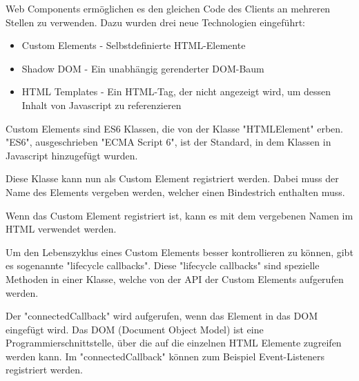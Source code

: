 
Web Components ermöglichen es den gleichen Code des Clients an mehreren Stellen zu verwenden. Dazu wurden drei neue Technologien \cite{MDNWebComponents} eingeführt:

\begin{itemize}
    \item Custom Elements - Selbstdefinierte HTML-Elemente
    \item Shadow DOM - Ein unabhängig gerenderter DOM-Baum
    \item HTML Templates - Ein HTML-Tag, der nicht angezeigt wird, um dessen Inhalt von Javascript zu referenzieren
\end{itemize}




Custom Elements sind ES6 Klassen, die von der Klasse "HTMLElement" erben. "ES6", ausgeschrieben "ECMA Script 6", ist der Standard, in dem Klassen in Javascript hinzugefügt wurden.\cite{MDNes6Classes}


Diese Klasse kann nun als Custom Element registriert werden. Dabei muss der Name des Elements vergeben werden, welcher einen Bindestrich enthalten muss.


Wenn das Custom Element registriert ist, kann es mit dem vergebenen Namen im HTML verwendet werden.



Um den Lebenszyklus eines Custom Elements besser kontrollieren zu können, gibt es sogenannte "lifecycle callbacks". Diese "lifecycle callbacks" sind spezielle Methoden in einer Klasse, welche von der API der Custom Elements aufgerufen werden. \cite{MDNWebCustomElements}

Der "{\ttfamily connectedCallback}" wird aufgerufen, wenn das Element in das DOM eingefügt wird. Das DOM (Document Object Model) ist eine Programmierschnittstelle, über die auf die einzelnen HTML Elemente zugreifen werden kann. \cite{MDNDOM} Im "{\ttfamily connectedCallback}" können zum Beispiel Event-Listeners registriert werden. \cite{MDNWebCustomElements}


